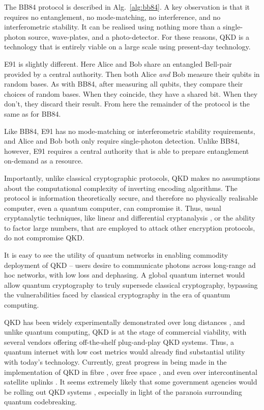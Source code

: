 \documentclass[aps,rmp,twocolumn,amsmath,amssymb,nofootinbib,superscriptaddress,longbibliography,floatfix,table-of-contents,eqsecnum]{revtex4-1}
\begin{document}
The BB84 protocol is described in Alg.~\ref{alg:bb84}. A key observation is that it requires no entanglement, no mode-matching, no interference, and no interferometric stability. It can be realised using nothing more than a single-photon source, wave-plates, and a photo-detector. For these reasons, QKD is a technology that is entirely viable on a large scale using present-day technology.

E91 is slightly different. Here Alice and Bob share an entangled Bell-pair provided by a central authority. Then both Alice \textit{and} Bob measure their qubits in random bases. As with BB84, after measuring all qubits, they compare their choices of random bases. When they coincide, they have a shared bit. When they don't, they discard their result. From here the remainder of the protocol is the same as for BB84.

Like BB84, E91 has no mode-matching or interferometric stability requirements, and Alice and Bob both only require single-photon detection. Unlike BB84, however, E91 requires a central authority that is able to prepare entanglement on-demand as a resource.

Importantly, unlike classical cryptographic protocols, QKD makes no assumptions about the computational complexity of inverting encoding algorithms. The protocol is information theoretically secure, and therefore no physically realisable computer, even a quantum computer, can compromise it. Thus, usual cryptanalytic techniques, like linear and differential cryptanalysis \cite{bib:Schneier96}, or the ability to factor large numbers, that are employed to attack other encryption protocols, do not compromise QKD.

It is easy to see the utility of quantum networks in enabling commodity deployment of QKD -- users desire to communicate photons across long-range ad hoc networks, with low loss and dephasing. A global quantum internet would allow quantum cryptography to truly supersede classical cryptography, bypassing the vulnerabilities faced by classical cryptography in the era of quantum computing.

QKD has been widely experimentally demonstrated over long distances \cite{bib:Muller96}, and unlike quantum computing, QKD is at the stage of commercial viability, with several vendors offering off-the-shelf plug-and-play QKD systems. Thus, a quantum internet with low cost metrics would already find substantial utility with today's technology. Currently, great progress in being made in the implementation of QKD in fibre \cite{???}, over free space \cite{bib:Buttler00}, and even over intercontinental satellite uplinks \cite{JWP}. It seems extremely likely that some government agencies would be rolling out QKD systems \cite{bib:Secret}, especially in light of the paranoia surrounding quantum codebreaking.
\end{document}
